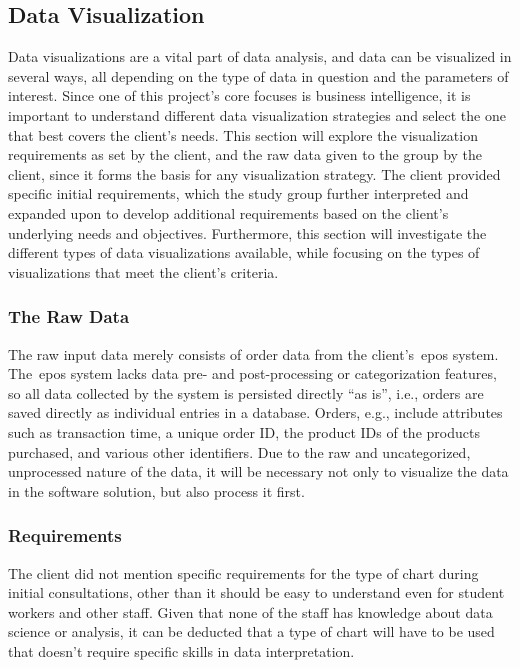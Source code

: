 \subsection{Data Visualization}\label{subsec:data-visualization}

Data visualizations are a vital part of data analysis, and data can be visualized in several ways, all depending on the
type of data in question and the parameters of interest.
Since one of this project's core focuses is business intelligence, it is important to understand different
data visualization strategies and select the one that best covers the client's needs.
This section will explore the visualization requirements as set by the client, and the raw data given to the group by
the client, since it forms the basis for any visualization strategy.
The client provided specific initial requirements, which the study group further interpreted and expanded upon to
develop additional requirements based on the client's underlying needs and objectives.
Furthermore, this section will investigate the different types of data visualizations available, while focusing on the
types of visualizations that meet the client's criteria.

\subsubsection{The Raw Data}\label{subsubsec:the-client's-raw-data}

The raw input data merely consists of order data from the client's~\acrshort{epos} system.
The~\acrshort{epos} system lacks data pre- and post-processing or categorization features, so all data collected by the
system is persisted directly ``as is'', i.e., orders are saved directly as individual entries in a database.
Orders, e.g., include attributes such as transaction time, a unique order ID, the product IDs of the products purchased,
and various other identifiers.
Due to the raw and uncategorized, unprocessed nature of the data, it will be necessary not only to visualize the data in
the software solution, but also process it first.

\subsubsection{Requirements}\label{subsubsec:requirements}

The client did not mention specific requirements for the type of chart during initial consultations, other than it
should be easy to understand even for student workers and other staff.
Given that none of the staff has knowledge about data science or analysis, it can be deducted that a type of chart will
have to be used that doesn't require specific skills in data interpretation.

